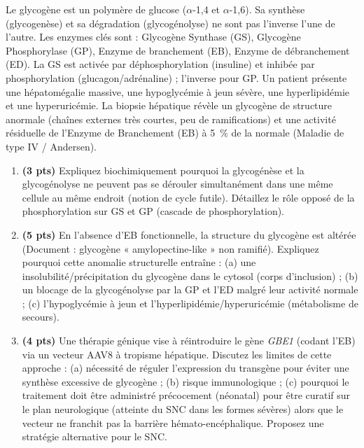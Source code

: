 \documentclass[11pt]{article}
\begin{document}
\begin{exercice}
Le glycogène est un polymère de glucose ($\alpha$-1,4 et $\alpha$-1,6). Sa synthèse (glycogenèse) et sa dégradation (glycogénolyse) ne sont pas l'inverse l'une de l'autre. Les enzymes clés sont : Glycogène Synthase (GS), Glycogène Phosphorylase (GP), Enzyme de branchement (EB), Enzyme de débranchement (ED). La GS est activée par déphosphorylation (insuline) et inhibée par phosphorylation (glucagon/adrénaline) ; l'inverse pour GP. Un patient présente une hépatomégalie massive, une hypoglycémie à jeun sévère, une hyperlipidémie et une hyperuricémie. La biopsie hépatique révèle un glycogène de structure anormale (chaînes externes très courtes, peu de ramifications) et une activité résiduelle de l'Enzyme de Branchement (EB) à \SI{5}{\%} de la normale (Maladie de type IV / Andersen).

\begin{enumerate}
\item \textbf{(3 pts)} Expliquez biochimiquement pourquoi la glycogénèse et la glycogénolyse ne peuvent pas se dérouler simultanément dans une même cellule au même endroit (notion de cycle futile). Détaillez le rôle opposé de la phosphorylation sur GS et GP (cascade de phosphorylation).
\item \textbf{(5 pts)} En l'absence d'EB fonctionnelle, la structure du glycogène est altérée (Document : glycogène « amylopectine-like » non ramifié). Expliquez pourquoi cette anomalie structurelle entraîne : (a) une insolubilité/précipitation du glycogène dans le cytosol (corps d'inclusion) ; (b) un blocage de la glycogénolyse par la GP et l'ED malgré leur activité normale ; (c) l'hypoglycémie à jeun et l'hyperlipidémie/hyperuricémie (métabolisme de secours).
\item \textbf{(4 pts)} Une thérapie génique vise à réintroduire le gène \textit{GBE1} (codant l'EB) via un vecteur AAV8 à tropisme hépatique. Discutez les limites de cette approche : (a) nécessité de réguler l'expression du transgène pour éviter une synthèse excessive de glycogène ; (b) risque immunologique ; (c) pourquoi le traitement doit être administré précocement (néonatal) pour être curatif sur le plan neurologique (atteinte du SNC dans les formes sévères) alors que le vecteur ne franchit pas la barrière hémato-encéphalique. Proposez une stratégie alternative pour le SNC.
\end{enumerate}
\end{exercice}
\end{document}

